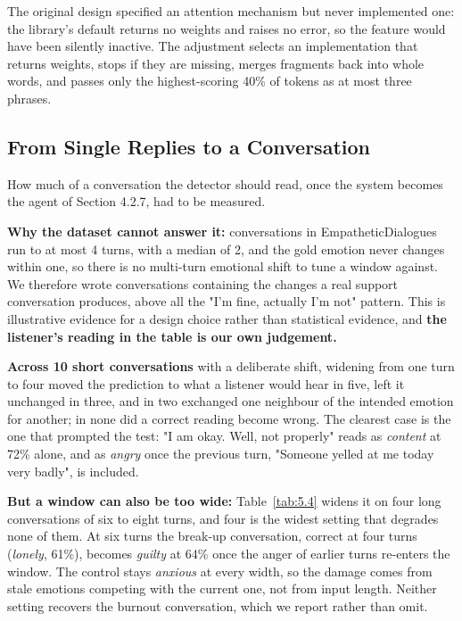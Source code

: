 The original design specified an attention mechanism but never implemented one: the library's default returns no weights and raises no error, so the feature would have been silently inactive. The adjustment selects an implementation that returns weights, stops if they are missing, merges fragments back into whole words, and passes only the highest-scoring 40\% of tokens as at most three phrases.

\subsection{From Single Replies to a Conversation}
\label{sec:5.3.2}

How much of a conversation the detector should read, once the system becomes the agent of Section 4.2.7, had to be measured.

\textbf{Why the dataset cannot answer it: }conversations in EmpatheticDialogues run to at most 4 turns, with a median of 2, and the gold emotion never changes within one, so there is no multi-turn emotional shift to tune a window against. We therefore wrote conversations containing the changes a real support conversation produces, above all the "I'm fine, actually I'm not" pattern. This is illustrative evidence for a design choice rather than statistical evidence, and \textbf{the listener's reading in the table is our own judgement.}

\textbf{Across 10 short conversations }with a deliberate shift, widening from one turn to four moved the prediction to what a listener would hear in five, left it unchanged in three, and in two exchanged one neighbour of the intended emotion for another; in none did a correct reading become wrong. The clearest case is the one that prompted the test: "I am okay. Well, not properly" reads as \textit{content} at 72\% alone, and as \textit{angry} once the previous turn, "Someone yelled at me today very badly", is included.

\textbf{But a window can also be too wide:} Table~\ref{tab:5.4} widens it on four long conversations of six to eight turns, and four is the widest setting that degrades none of them. At six turns the break-up conversation, correct at four turns (\textit{lonely}, 61\%), becomes \textit{guilty} at 64\% once the anger of earlier turns re-enters the window. The control stays \textit{anxious} at every width, so the damage comes from stale emotions competing with the current one, not from input length. Neither setting recovers the burnout conversation, which we report rather than omit.

